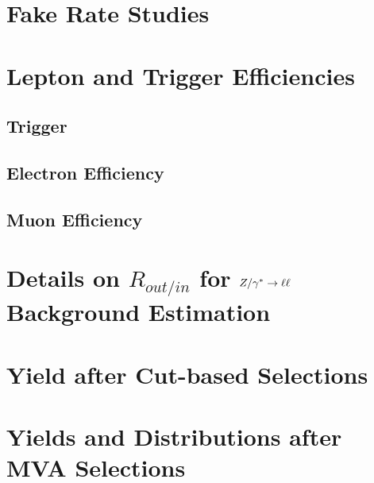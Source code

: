 \documentclass{cmspaper}
\begin{document}
  \section{Fake Rate Studies}
     \label{app:fake_rate_studies}
 
\clearpage 
  \section{Lepton and Trigger Efficiencies}
     \label{app:efficiency_studies}
     \subsection{Trigger}
     \subsection{Electron Efficiency}
     \subsection{Muon Efficiency}

\clearpage 

\section{ Details on $R_{out/in}$ for $Z/\gamma^*\to\ell\ell$ Background Estimation}
     \label{app:appendix_dyr}
\clearpage




\clearpage 

  \section{Yield after Cut-based Selections}
     \label{app:appendix_cutresults}
\clearpage

  \section{Yields and Distributions after MVA Selections}
     \label{app:appendix_bdtresults}
\end{document}
